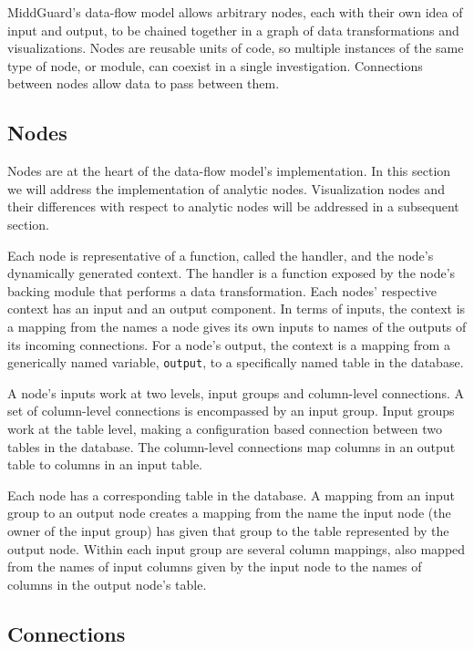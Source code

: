 \documentclass[midd]{thesis}
\begin{document}
MiddGuard's data-flow model allows arbitrary nodes, each with their own idea of
input and output, to be chained together in a graph of data transformations and
visualizations. Nodes are reusable units of code, so multiple instances of the
same type of node, or module, can coexist in a single investigation. Connections
between nodes allow data to pass between them.

\subsection{Nodes}

Nodes are at the heart of the data-flow model's implementation. In this section
we will address the implementation of analytic nodes. Visualization nodes and
their differences with respect to analytic nodes will be addressed in a
subsequent section.

Each node is representative of a function, called the handler, and the node's
dynamically generated context. The handler is a function exposed by the node's
backing module that performs a data transformation. Each nodes' respective
context has an input and an output component. In terms of inputs, the context is
a mapping from the names a node gives its own inputs to names of the outputs of
its incoming connections. For a node's output, the context is a mapping from a
generically named variable, \texttt{output}, to a specifically named table in
the database.

A node's inputs work at two levels, input groups and column-level connections. A
set of column-level connections is encompassed by an input group. Input groups
work at the table level, making a configuration based connection between two
tables in the database. The column-level connections map columns in an output
table to columns in an input table.

Each node has a corresponding table in the database. A mapping from an input
group to an output node creates a mapping from the name the input node (the
owner of the input group) has given that group to the table represented by the
output node. Within each input group are several column mappings, also mapped
from the names of input columns given by the input node to the names of columns
in the output node's table.

\subsection{Connections}
\end{document}
